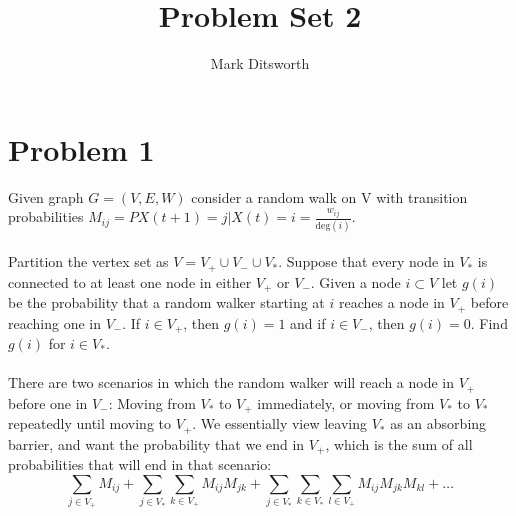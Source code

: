 \documentclass{amsart}
\title{Problem Set 2}
\author{Mark Ditsworth}
\begin{document}
	\maketitle
	\section{Problem 1}
	Given graph $G=(V,E,W)$ consider a random walk on V with transition probabilities $M_{ij} = P{X(t+1)=j | X(t)=i} = \frac{w_{ij}}{\text{deg}(i)}$.
	\\\\
	Partition the vertex set as $V = V_+ \cup V_- \cup V_*$. Suppose that every node in $V_*$ is connected to at least one node in either $V_+$ or $V_-$. Given a node $i \subset V$ let $g(i)$ be the probability that a random walker starting at $i$ reaches a node in $V_+$ before reaching one in $V_-$. If $i \in V_+$, then $g(i)=1$ and if $i \in V_-$, then $g(i)=0$. Find $g(i)$ for $i \in V_*$.
	\\\\
	
	There are two scenarios in which the random walker will reach a node in $V_+$ before one in $V_-$: Moving from $V_*$ to $V_+$ immediately, or moving from $V_*$ to $V_*$ repeatedly until moving to $V_+$. We essentially view leaving $V_*$ as an absorbing barrier, and want the probability that we end in $V_+$, which is the sum of all probabilities that will end in that scenario:
	\[
	\sum_{j \in V_+}M_{ij} + \sum_{j \in V_*}\sum_{k \in V_+}M_{ij}M_{jk} + \sum_{j \in V_*}\sum_{k \in V_*}\sum_{l \in V_+}M_{ij}M_{jk}M_{kl} + \dots
	\]	
	
\end{document}
